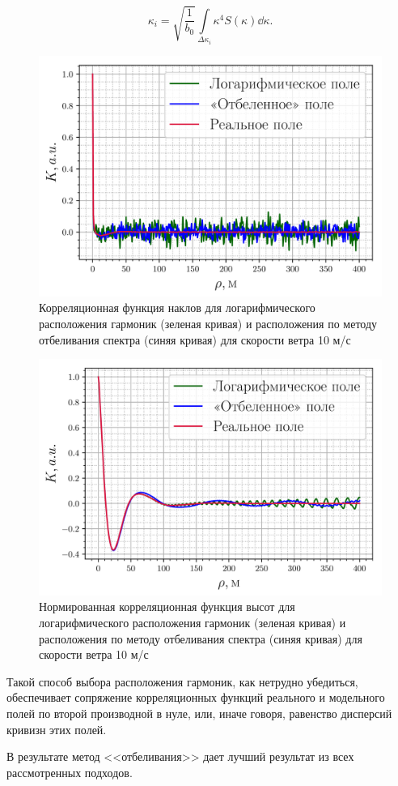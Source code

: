 \begin{equation}
    \label{eq:ki_slopes}
    {
        \kappa_i = \sqrt{\frac{1}{b_0}} \int\limits_{\Delta \kappa_i}
        \kappa^4 S(\kappa) \dd \kappa. 
    }
\end{equation}

\begin{figure}[ht]
    \centering
    \includegraphics[width=0.6\linewidth]{fig/correlation_angles_wa.png}
    \caption{ Корреляционная функция наклов для логарифмического расположения
    гармоник (зеленая кривая) и расположения по методу отбеливания спектра
(синяя кривая) для скорости ветра 10 м/с}
    \label{fig:nodes}
\end{figure}

\begin{figure}[ht]
    \centering
    \includegraphics[width=0.6\linewidth]{fig/correlation_height_wa.png}
    \caption{ Нормированная корреляционная функция высот для логарифмического расположения
    гармоник (зеленая кривая) и расположения по методу отбеливания спектра
(синяя кривая) для скорости ветра 10 м/с}
\end{figure}
Такой способ выбора расположения гармоник, как нетрудно убедиться, обеспечивает
сопряжение корреляционных функций реального и модельного полей по второй
производной в нуле, или, иначе говоря, равенство дисперсий кривизн этих
полей.

В результате метод <<отбеливания>> дает лучший результат из всех рассмотренных подходов. 


